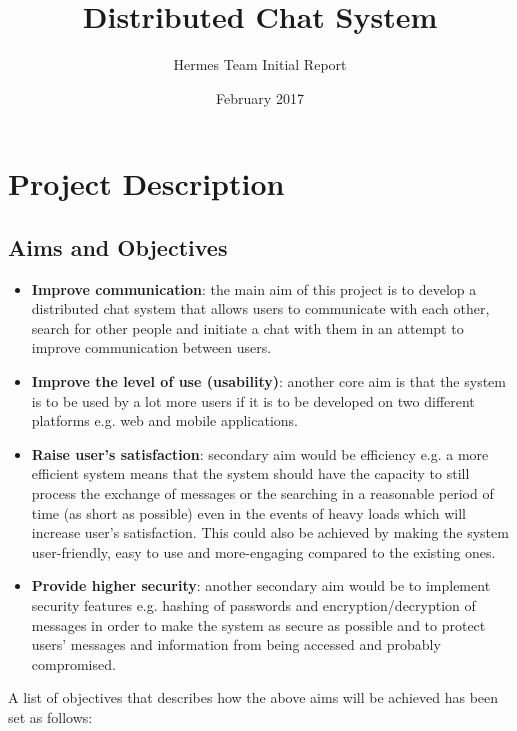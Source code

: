 \documentclass{article}
\title{Distributed Chat System}
\author{Hermes Team Initial Report}
\date{February 2017}
\begin{document}
\maketitle
\section{Project Description}
\subsection {Aims and Objectives} 
\begin{itemize}
\item \textbf {Improve communication}: the main aim of this project is to develop a distributed chat system that allows users to communicate with each other, search for other people and initiate a chat with them in an attempt to improve communication between users. 
    
\item \textbf {Improve the level of use (usability)}: another core aim is that the system is to be used by a lot more users if it is to be developed on two different platforms e.g. web and mobile applications.  
 
\item \textbf{Raise user’s satisfaction}: secondary aim would be efficiency e.g. a more efficient system means that the system should have the capacity to still process the exchange of messages or the searching in a reasonable period of time (as short as possible) even in the events of heavy loads which will increase user’s satisfaction. This could also be achieved by making the system user-friendly, easy to use and more-engaging compared to the existing ones. 
 
\item \textbf{Provide higher security}: another secondary aim would be to implement security features e.g. hashing of passwords and encryption/decryption of messages in order to make the system as secure as possible and to protect users’ messages and information from being accessed and probably compromised. 
 
\end{itemize}

\par A list of objectives that describes how the above aims will be achieved has been set as follows: 
\end{document}
